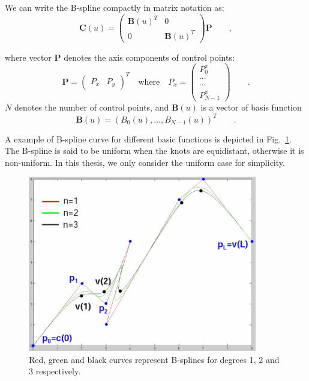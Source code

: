 We can write the B-spline compactly in matrix notation as:
\begin{equation}
  \label{eq:4.3}
  \mathbf{C}(u) = 
  \begin{pmatrix}
\mathbf{B}(u)^T & 0 \\
0 &\mathbf{B}(u)^T
  \end{pmatrix}
\mathbf{P}\qquad,
\end{equation}

where vector $\mathbf{P}$ denotes the axis components of control
points:
\begin{equation}
  \label{eq:4.4}
  \mathbf{P} =
  \begin{pmatrix}
    P_x & P_y    
  \end{pmatrix}^T \quad \mathrm{where} \quad P_x =
  \begin{pmatrix}
    P_0^x\\
    \cdots\\
    \cdots\\
    P_{N-1}^x
  \end{pmatrix}\qquad .
\end{equation}
$N$ denotes the number of control points, and $\mathbf{B}(u)$ is a
vector of basis function
\begin{equation}
  \label{eq:4.5}
  \mathbf{B}(u) = (B_0(u), \ldots, B_{N-1}(u))^T\qquad.
\end{equation}

A example of B-spline curve for different basic functions is depicted
in Fig.~\ref{fig:bspline}. The B-spline is said to be uniform when the knots are equidistant,
otherwise it is non-uniform. In this thesis, we only
consider the uniform case for simplicity.
\begin{figure}[htb]
  \centering
  \includegraphics[width=10cm]{images/bspline.jpg}
  \caption[B-spline curves for different degrees~\cite{contourpanin2011}]{Red, green and black
    curves represent B-splines for degrees 1, 2 and 3 respectively.}
\label{fig:bspline}
\end{figure}

